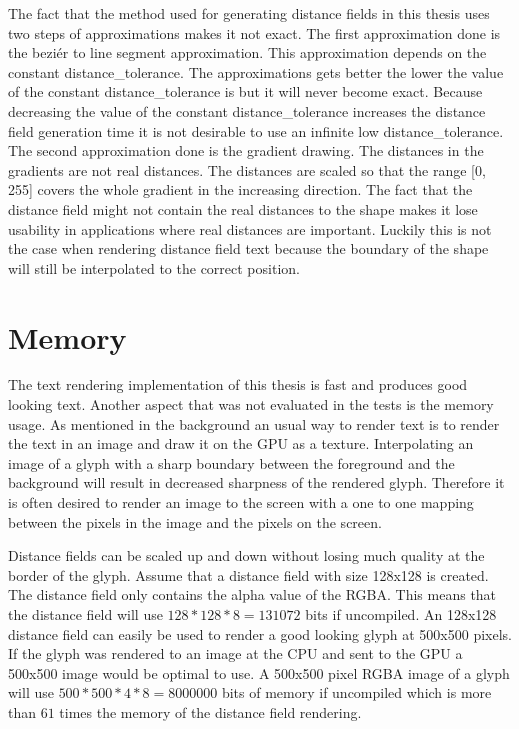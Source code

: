 The fact that the method used for generating distance fields in this thesis uses two steps of approximations makes it not exact. The first approximation done is the beziér to line segment approximation. This approximation depends on the constant distance\_tolerance. The approximations gets better the lower the value of the constant distance\_tolerance is but it will never become exact. Because decreasing the value of the constant distance\_tolerance increases the distance field generation time it is not desirable to use an infinite low distance\_tolerance. The second approximation done is the gradient drawing. The distances in the gradients are not real distances. The distances are scaled so that the range [0, 255] covers the whole gradient in the increasing direction. The fact that the distance field might not contain the real distances to the shape makes it lose usability in applications where real distances are important. Luckily this is not the case when rendering distance field text because the boundary of the shape will still be interpolated to the correct position.

\section{Memory}
The text rendering implementation of this thesis is fast and produces good looking text. Another aspect that was not evaluated in the tests is the memory usage. As mentioned in the background an usual way to render text is to render the text in an image and draw it on the GPU as a texture. Interpolating an image of a glyph with a sharp boundary between the foreground and the background will result in decreased sharpness of the rendered glyph. Therefore it is often desired to render an image to the screen with a one to one mapping between the pixels in the image and the pixels on the screen. 

Distance fields can be scaled up and down without losing much quality at the border of the glyph. Assume that a distance field with size 128x128 is created. The distance field only contains the alpha value of the RGBA. This means that the distance field will use $128*128*8 = 131072$ bits if uncompiled. An 128x128 distance field can easily be used to render a good looking glyph at 500x500 pixels. If the glyph was rendered to an image at the CPU and sent to the GPU a 500x500 image would be optimal to use. A 500x500 pixel RGBA image of a glyph will use $500*500*4*8 = 8000000$ bits of memory if uncompiled which is more than $61$ times the memory of the distance field rendering.

